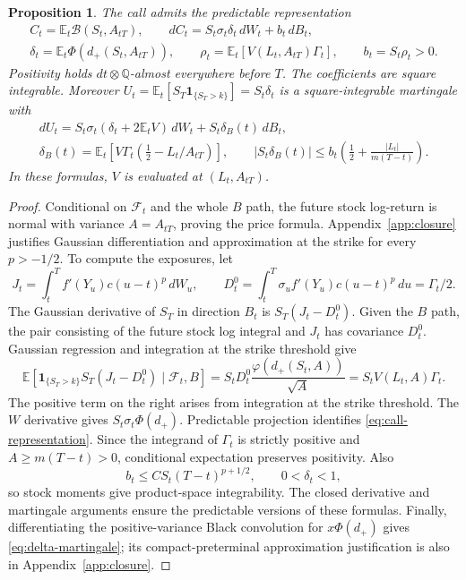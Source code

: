 \documentclass[11pt,a4paper]{amsart}
\theoremstyle{plain}
\newtheorem{proposition}[theorem]{Proposition}
\theoremstyle{definition}
\theoremstyle{remark}
\newcommand{\EE}{\mathbb{E}}
\newcommand{\QQ}{\mathbb{Q}}
\newcommand{\F}{\mathcal F}
\newcommand{\ph}{\varphi}
\newcommand{\BS}{\mathcal B}
\begin{document}
\begin{proposition}\label{prop:call}
The call admits the predictable representation
\begin{equation}\label{eq:call-representation}
 \begin{gathered}
 C_t=\EE_t\BS(S_t,A_{tT}),\qquad
 dC_t=S_t\sigma_t\delta_t\,dW_t+b_t\,dB_t,\\
 \delta_t=\EE_t\Phi(d_+(S_t,A_{tT})),\qquad
 \rho_t=\EE_t[V(L_t,A_{tT})\Gamma_t],\qquad b_t=S_t\rho_t>0.
 \end{gathered}
\end{equation}
Positivity holds $dt\otimes\QQ$-almost everywhere before $T$. The coefficients are square integrable. Moreover $U_t=\EE_t[S_T\mathbf1_{\{S_T>k\}}]=S_t\delta_t$ is a square-integrable martingale with
\begin{equation}\label{eq:delta-martingale}
 \begin{gathered}
 dU_t=S_t\sigma_t(\delta_t+2\EE_tV)\,dW_t
             +S_t\delta_B(t)\,dB_t,\\
 \delta_B(t)=\EE_t[V\Gamma_t(\tfrac12-L_t/A_{tT})],\qquad
 |S_t\delta_B(t)|\le b_t\left(\tfrac12+\frac{|L_t|}{m(T-t)}\right).
 \end{gathered}
\end{equation}
In these formulas, $V$ is evaluated at $(L_t,A_{tT})$.
\end{proposition}
\begin{proof}
Conditional on $\F_t$ and the whole $B$ path, the future stock log-return is normal with variance $A=A_{tT}$, proving the price formula. Appendix~\ref{app:closure} justifies Gaussian differentiation and approximation at the strike for every $p>-1/2$. To compute the exposures, let
\[
 J_t=\int_t^T f'(Y_u)c(u-t)^p\,dW_u,\qquad
 D_t^0=\int_t^T\sigma_u f'(Y_u)c(u-t)^p\,du=\Gamma_t/2.
\]
The Gaussian derivative of $S_T$ in direction $B_t$ is $S_T(J_t-D_t^0)$. Given the $B$ path, the pair consisting of the future stock log integral and $J_t$ has covariance $D_t^0$. Gaussian regression and integration at the strike threshold give
\[
 \EE[\mathbf1_{\{S_T>k\}}S_T(J_t-D_t^0)\mid\F_t,B]
 =S_tD_t^0\frac{\ph(d_+(S_t,A))}{\sqrt A}
 =S_tV(L_t,A)\Gamma_t.
\]
The positive term on the right arises from integration at the strike threshold. The $W$ derivative gives $S_t\sigma_t\Phi(d_+)$. Predictable projection identifies \eqref{eq:call-representation}. Since the integrand of $\Gamma_t$ is strictly positive and $A\ge m(T-t)>0$, conditional expectation preserves positivity. Also
\[
 b_t\le C S_t(T-t)^{p+1/2},\qquad 0<\delta_t<1,
\]
so stock moments give product-space integrability. The closed derivative and martingale arguments ensure the predictable versions of these formulas. Finally, differentiating the positive-variance Black convolution for $x\Phi(d_+)$ gives \eqref{eq:delta-martingale}; its compact-preterminal approximation justification is also in Appendix~\ref{app:closure}.
\end{proof}
\end{document}
